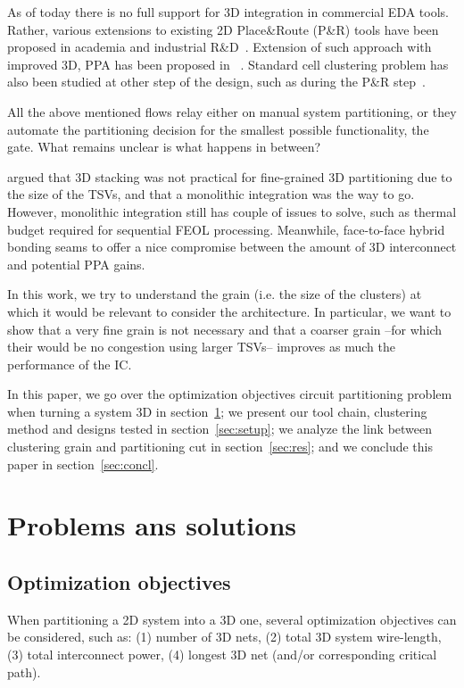 \documentclass[conference]{IEEEtran}
\begin{document}
As of today there is no full support for 3D integration in commercial EDA tools. Rather, various extensions to existing 2D Place\&Route (P\&R) tools have been proposed in academia and industrial R\&D~\cite{Panth}. %
Extension of such approach with improved 3D, PPA has been proposed in ~\cite{Chang2016}. %
Standard cell clustering problem has also been studied at other step of the design, such as during the P\&R step~\cite{Moura2017}. %

All the above mentioned flows relay either on manual system partitioning, or they automate the partitioning decision for the smallest possible functionality, the gate. What remains unclear is what happens in between?  

\cite{Samal2017} argued that 3D stacking was not practical for fine-grained 3D partitioning due to the size of the TSVs, and that a monolithic integration was the way to go. However, monolithic integration still has couple of issues to solve, such as thermal budget required for sequential FEOL processing. Meanwhile, face-to-face hybrid bonding seams to offer a nice compromise between the amount of 3D interconnect and potential PPA gains.

In this work, we try to understand the grain (i.e. the size of the clusters) at which it would be relevant to consider the architecture.
In particular, we want to show that a very fine grain is not necessary and that a coarser grain --for which their would be no congestion using larger TSVs-- improves as much the performance of the IC.


In this paper, we go over the optimization objectives circuit partitioning problem when turning a system 3D in section~\ref{sec:optobj}; we present our tool chain, clustering method and designs tested in section~\ref{sec:setup}; we analyze the link between clustering grain and partitioning cut in section~\ref{sec:res}; and we conclude this paper in section~\ref{sec:concl}.

\section{Problems ans solutions}\label{sec:optobj}
\subsection{Optimization objectives}
When partitioning a 2D system into a 3D one, several optimization objectives can be considered, such as: (1) number of 3D nets, (2) total 3D system wire-length, (3) total interconnect power, (4) longest 3D net (and/or corresponding critical path).
\end{document}
